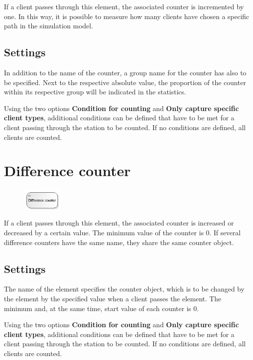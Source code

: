If a client passes through this element, the associated counter is incremented by one.
In this way, it is possible to measure how many clients have chosen a specific path in the simulation model.

\subsection*{Settings}

In addition to the name of the counter, a group name for the counter has also to be specified.
Next to the respective absolute value, the proportion of the counter within its respective group
will be indicated in the statistics.

Using the two options \textbf{Condition for counting} and \textbf{Only capture specific client types},
additional conditions can be defined that have to be met for a client passing through the station to be counted.
If no conditions are defined, all clients are counted.


\section{Difference counter}
\label{ref:ModelElementDifferentialCounter}

\begin{figure}
\vspace{-22pt}
\includegraphics[width=2cm]{imageModelElementDifferentialCounter.png}
\vspace{-22pt}
\end{figure}

If a client passes through this element, the associated counter is increased or decreased by a certain value.
The minimum value of the counter is 0. If several difference counters have the same name, they share the same
counter object.

\subsection*{Settings}

The name of the element specifies the counter object, which is to be changed by the element by the specified value
when a client passes the element. The minimum and, at the same time, start value of each counter is 0.

Using the two options \textbf{Condition for counting} and \textbf{Only capture specific client types},
additional conditions can be defined that have to be met for a client passing through the station to be counted.
If no conditions are defined, all clients are counted.


